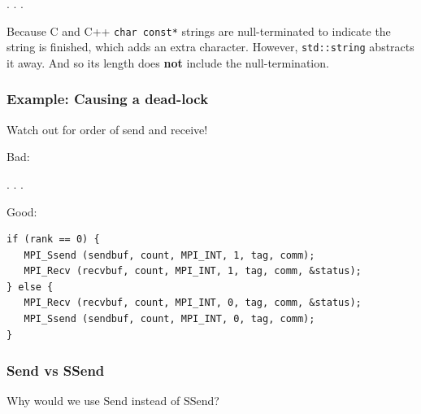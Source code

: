 . . .

Because C and C++ \texttt{char const*} strings are null-terminated to
indicate the string is finished, which adds an extra character. However,
\texttt{std::string} abstracts it away. And so its length does
\textbf{not} include the null-termination.

\subsubsection{Example: Causing a
dead-lock}\label{example-causing-a-dead-lock}

Watch out for order of send and receive!

Bad:

\begin{Shaded}
\begin{Highlighting}[]
 \NormalTok{) \{}
\NormalTok{\} } \NormalTok{\{}
\NormalTok{\}}
\end{Highlighting}
\end{Shaded}

. . .

Good:

\begin{verbatim}
if (rank == 0) {
   MPI_Ssend (sendbuf, count, MPI_INT, 1, tag, comm);
   MPI_Recv (recvbuf, count, MPI_INT, 1, tag, comm, &status);
} else {
   MPI_Recv (recvbuf, count, MPI_INT, 0, tag, comm, &status);
   MPI_Ssend (sendbuf, count, MPI_INT, 0, tag, comm);
}
\end{verbatim}

\subsubsection{Send vs SSend}\label{send-vs-ssend}

Why would we use Send instead of SSend?

